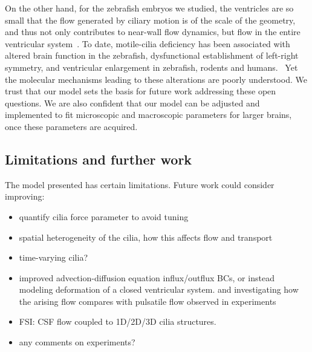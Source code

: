 \documentclass{WileyMSP-template}
\begin{document}
On the other hand, for the zebrafish embryos we studied,
the ventricles are so small that the flow
generated by ciliary motion is of the scale of the geometry, and thus not
only contributes to near-wall flow dynamics, but flow in the entire ventricular
system~\cite{Olstad2019CiliaryDevelopment}.
To date, motile-cilia deficiency has been associated with altered brain function
in the zebrafish, dysfunctional establishment of left-right symmetry,
and ventricular enlargement in zebrafish, rodents and humans.~\cite{Afzelius2004Cilia-relatedDiseases,
Youn2018PrimaryDiseases, Ma2024CiliaDisease, Ibanez-Tallon2002LossHydrocephalus}
Yet the molecular mechanisms leading to these alterations are poorly understood.
We trust that our model sets the basis for future work addressing these open questions.
We are also confident that our model can be adjusted and implemented to fit
microscopic and macroscopic parameters for larger brains, once these parameters are acquired.

\subsection{Limitations and further work}
The model presented has certain limitations. Future work could consider improving:
\begin{itemize}
    \item quantify cilia force parameter to avoid tuning
    \item spatial heterogeneity of the cilia, how this affects flow and transport
    \item time-varying cilia?
    \item improved advection-diffusion equation influx/outflux BCs, or instead
    modeling deformation of a closed ventricular system. 
    and investigating how the arising flow compares with pulsatile flow observed in experiments
    \item FSI: CSF flow coupled to 1D/2D/3D cilia structures.
    \item any comments on experiments?
\end{itemize}
\end{document}
